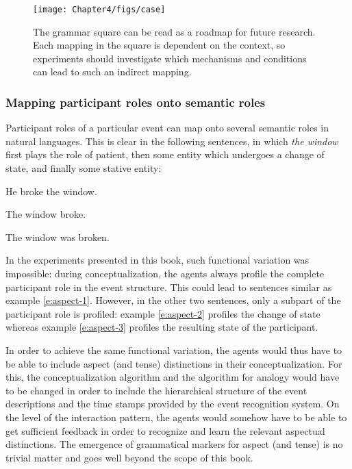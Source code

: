 \begin{figure} 
\centerline{\texttt{[image: Chapter4/figs/case]}}
  \caption[The grammatical square]{The grammar square can be read as a roadmap for future research. Each mapping in the square is dependent on the context, so experiments should investigate which mechanisms and conditions can lead to such an indirect mapping.}
   \label{f:square-bis}
\end{figure}

\subsubsection{Mapping participant roles onto semantic roles}
 Participant roles of a particular event can map onto several semantic roles in natural languages. This is clear in the following sentences, in which {\em the window} first plays the role of patient, then some entity which undergoes a change of state, and finally some stative entity:

\ea
He broke the window.
\label{e:aspect-1}
\item The window broke.
\label{e:aspect-2}
\item The window was broken.
\label{e:aspect-3}
\z

In the experiments presented in this book, such functional variation was impossible: during conceptualization, the agents always profile the complete participant role in the event structure. This could lead to sentences similar as example \ref{e:aspect-1}. However, in the other two sentences, only a subpart of the participant role is profiled: example \ref{e:aspect-2} profiles the change of state whereas example \ref{e:aspect-3} profiles the resulting state of the participant.

In order to achieve the same functional variation, the agents would thus have to be able to include aspect (and tense) distinctions in their conceptualization. For this, the conceptualization algorithm and the algorithm for analogy would have to be changed in order to include the hierarchical structure of the event descriptions and the time stamps provided by the event recognition system. On the level of the interaction pattern, the agents would somehow have to be able to get sufficient feedback in order to recognize and learn the relevant aspectual distinctions. The emergence of grammatical markers for aspect (and tense) is no trivial matter and goes well beyond the scope of this book.


